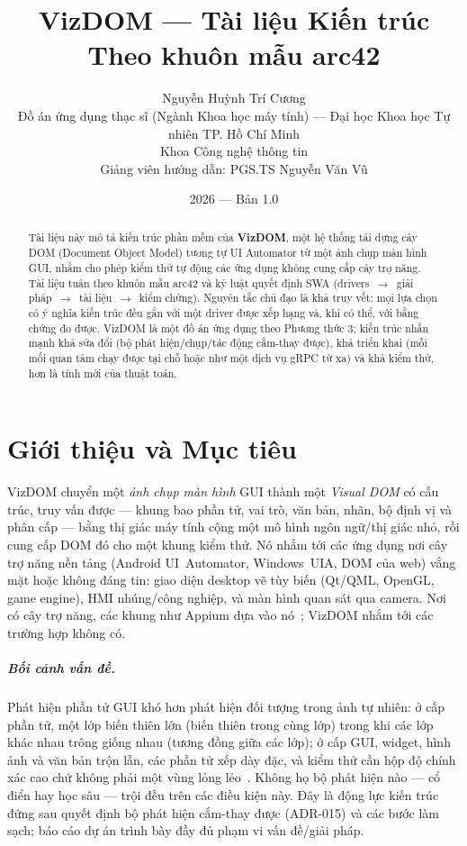 \documentclass[11pt,a4paper]{report}
\title{\textbf{VizDOM --- Tài liệu Kiến trúc}\\[0.3em]
\large Theo khuôn mẫu arc42}
\author{Nguyễn Huỳnh Trí Cương\\
\small Đồ án ứng dụng thạc sĩ (Ngành Khoa học máy tính) --- Đại học Khoa học Tự nhiên TP. Hồ Chí Minh\\
\small Khoa Công nghệ thông tin\\
\small Giảng viên hướng dẫn: PGS.TS Nguyễn Văn Vũ}
\date{2026 --- Bản 1.0}
\begin{document}
\maketitle

\begin{abstract}
\noindent Tài liệu này mô tả kiến trúc phần mềm của \textbf{VizDOM}, một hệ thống tái
dựng cây DOM (Document Object Model) tương tự UI Automator từ một ảnh chụp màn hình
GUI, nhằm cho phép kiểm thử tự động các ứng dụng không cung cấp cây trợ năng. Tài
liệu tuân theo khuôn mẫu arc42 và kỷ luật quyết định SWA
(drivers~$\rightarrow$~giải pháp~$\rightarrow$~tài liệu~$\rightarrow$~kiểm chứng).
Nguyên tắc chủ đạo là khả truy vết: mọi lựa chọn có ý nghĩa kiến trúc đều gắn với một
driver được xếp hạng và, khi có thể, với bằng chứng đo được. VizDOM là một đồ án ứng
dụng theo Phương thức 3; kiến trúc nhấn mạnh khả sửa đổi (bộ phát hiện/chụp/tác động
cắm-thay được), khả triển khai (mỗi mối quan tâm chạy được tại chỗ hoặc như một dịch
vụ gRPC từ xa) và khả kiểm thử, hơn là tính mới của thuật toán.
\end{abstract}

\tableofcontents

\chapter{Giới thiệu và Mục tiêu}
VizDOM chuyển một \emph{ảnh chụp màn hình} GUI thành một \emph{Visual DOM} có cấu trúc,
truy vấn được --- khung bao phần tử, vai trò, văn bản, nhãn, bộ định vị và phân cấp
--- bằng thị giác máy tính cộng một mô hình ngôn ngữ/thị giác nhỏ, rồi cung cấp DOM đó
cho một khung kiểm thử. Nó nhắm tới các ứng dụng nơi cây trợ năng nền tảng (Android
UI~Automator, Windows~UIA, DOM của web) vắng mặt hoặc không đáng tin: giao diện
desktop vẽ tùy biến (Qt/QML, OpenGL, game engine), HMI nhúng/công nghiệp, và màn hình
quan sát qua camera. Nơi có cây trợ năng, các khung như Appium dựa vào
nó~\cite{uiautomator,appium}; VizDOM nhắm tới các trường hợp không có.

\paragraph{Bối cảnh vấn đề.} Phát hiện phần tử GUI khó hơn phát hiện đối tượng trong
ảnh tự nhiên: ở cấp phần tử, một lớp biến thiên lớn (biến thiên trong cùng lớp) trong
khi các lớp khác nhau trông giống nhau (tương đồng giữa các lớp); ở cấp GUI, widget,
hình ảnh và văn bản trộn lẫn, các phần tử xếp dày đặc, và kiểm thử cần hộp độ chính
xác cao chứ không phải một vùng lỏng lẻo~\cite{xie2020uied}. Không họ bộ phát hiện nào
--- cổ điển hay học sâu --- trội đều trên các điều kiện này. Đây là động lực kiến trúc
đứng sau quyết định bộ phát hiện cắm-thay được (ADR-015) và các bước làm sạch; báo cáo
dự án trình bày đầy đủ phạm vi vấn đề/giải pháp.
\end{document}
